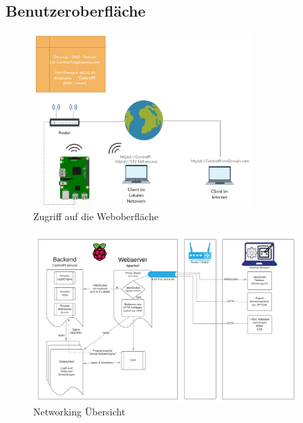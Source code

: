 \subsection{Benutzeroberfläche}
 \begin{figure}[H]
	\begin{center}
		\includegraphics[width=0.75\textwidth ,clip]{./images/IFTTT.pdf}
		\caption{Zugriff auf die Weboberfläche}
		\label{img:externalAccess}
	\end{center} 
\end{figure}

\begin{figure}[H]
	\begin{center}
		\includegraphics[width=0.9\textwidth ,clip]{./images/BackendFrontend.pdf}
		\caption{Networking Übersicht}
		\label{img:externalNetworking}
	\end{center} 
\end{figure}
